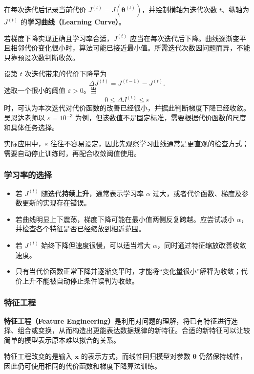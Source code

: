 \documentclass[12pt,a4paper]{ctexart}
\newcommand{\warning}[1]{\textbf{\textcolor{ErrorColor}{#1}}}
\newcommand{\concept}[1]{\textbf{\textcolor{DefineColor}{#1}}}
\begin{document}
\begin{keybox}[通过学习曲线判断收敛]
在每次迭代后记录当前代价
$J^{(t)}=J\!\left(\boldsymbol{\theta}^{(t)}\right)$，并绘制横轴为迭代次数 $t$、纵轴为 $J^{(t)}$ 的\concept{学习曲线（Learning Curve）}。

若梯度下降实现正确且学习率合适，$J^{(t)}$ 应当在每次迭代后下降。曲线逐渐变平且相邻代价变化很小时，算法可能已接近最小值。所需迭代次数因问题而异，不能只靠预设次数判断收敛。
\end{keybox}

\begin{definitionbox}[自动收敛测试]
设第 $t$ 次迭代带来的代价下降量为
\[
  \Delta J^{(t)}=J^{(t-1)}-J^{(t)}.
\]
选取一个很小的阈值 $\varepsilon>0$。当
\[
  0\leq \Delta J^{(t)}\leq\varepsilon
\]
时，可认为本次迭代对代价函数的改善已经很小，并据此判断梯度下降已经收敛。吴恩达老师以 $\varepsilon=10^{-3}$ 为例，但该数值不是固定标准，需要根据代价函数的尺度和具体任务选择。

实际应用中，$\varepsilon$ 往往不容易设定，因此先观察学习曲线通常是更直观的检查方式；需要自动停止训练时，再配合收敛阈值使用。
\end{definitionbox}
\subsubsection{学习率的选择}
\begin{mistakebox}[学习曲线异常时如何排查]
\begin{itemize}
  \item 若 $J^{(t)}$ 随迭代\warning{持续上升}，通常表示学习率 $\alpha$ 过大，或者代价函数、梯度及参数更新的实现存在错误。
  \item 若曲线明显上下震荡，梯度下降可能在最小值两侧反复跨越。应尝试减小 $\alpha$，并检查各个特征是否已经缩放到相近范围。
  \item 若 $J^{(t)}$ 始终下降但速度很慢，可以适当增大 $\alpha$，同时通过特征缩放改善收敛速度。
  \item 只有当代价函数正常下降并逐渐变平时，才能将“变化量很小”解释为收敛；代价上升不能被自动停止条件误判为收敛。
\end{itemize}
\end{mistakebox}
\subsubsection{特征工程}

\begin{definitionbox}[什么是特征工程]
\concept{特征工程（Feature Engineering）}是利用对问题的理解，将已有特征进行选择、组合或变换，从而构造出更能表达数据规律的新特征。合适的新特征可以让较简单的模型表示原本难以拟合的关系。

特征工程改变的是输入 $\mathbf{x}$ 的表示方式，而线性回归模型对参数 $\boldsymbol{\theta}$ 仍然保持线性，因此仍可使用相同的代价函数和梯度下降算法训练。
\end{definitionbox}
\end{document}
